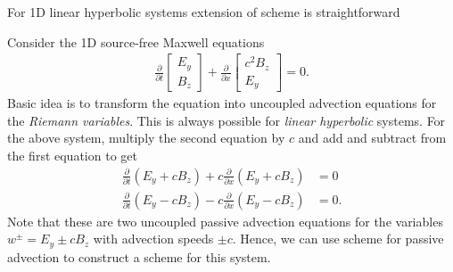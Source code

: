 \documentclass[pdf]{beamer}
\theoremstyle{definition}
\begin{document}
\begin{frame}{For 1D linear hyperbolic systems extension of scheme is
    straightforward}

  Consider the 1D source-free Maxwell equations
  \begin{align*}
    \frac{\partial }{\partial t}
    \left[
    \begin{matrix}
      E_y \\
      B_z
    \end{matrix}
    \right]
    +
    \frac{\partial }{\partial x}
    \left[
    \begin{matrix}
      c^2B_z \\
      E_y
    \end{matrix}
    \right]
    =
    0.
  \end{align*}
  Basic idea is to transform the equation into uncoupled advection
  equations for the \emph{Riemann variables}. This is always possible
  for \emph{linear hyperbolic} systems. For the above system, multiply
  the second equation by $c$ and add and subtract from the first
  equation to get
  \begin{align*}
    \frac{\partial }{\partial t}\left(E_y + c B_z\right) + c \frac{\partial }{\partial x}\left(E_y + c B_z\right) &= 0 \\
    \frac{\partial }{\partial t}\left(E_y - c B_z\right) - c \frac{\partial }{\partial x}\left(E_y - c B_z\right) &= 0.
  \end{align*}
  Note that these are two uncoupled passive advection equations for
  the variables $w^\pm = E_y \pm c B_z$ with advection speeds $\pm
  c$. Hence, we can use scheme for passive advection to construct a
  scheme for this system.
  
\end{frame}

\end{document}
